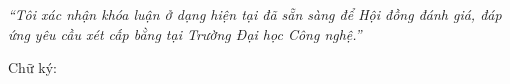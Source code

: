 
\textit{\enquote{Tôi xác nhận khóa luận ở dạng hiện tại đã sẵn sàng để Hội đồng đánh giá, đáp ứng yêu cầu xét cấp bằng \thesisDegreeName{} tại Trường Đại học Công nghệ.}}

\vspace{1.5cm}
Chữ ký:\makebox[3.2in]{\dotfill}
